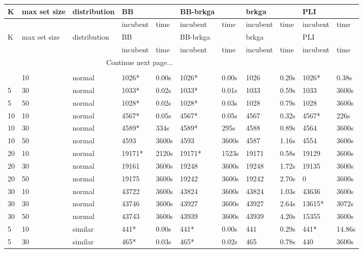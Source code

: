 \begin{scriptsize}
\setlength\LTleft{0pt}            %
\setlength\LTright{0pt}           %
\begin{longtable}{@{\extracolsep{\fill}}lllllllllll@{}}
\label{table:tests}\\
\hline
K & max set size & distribution & BB & & BB-brkga & & brkga & & PLI\\ 
\hline
& & & incubent & time & incubent & time & incubent & time & incubent & time\\ 
\hline
\endfirsthead
\hline
K & max set size & distribution & BB & & BB-brkga & & brkga & & PLI\\ 
\hline
& & & incubent & time & incubent & time & incubent & time & incubent & time\\ 
\hline
\endhead
\hline \multicolumn{5}{r}{{Continue next page...}} \\ 
\endfoot
\multicolumn{5}{r}{{}} \\ 
\endlastfoot
 5 & 10 & normal& 1026*& 0.00s& 1026*& 0.00s & 1026& 0.20s & 1026*& 0.38s \\
 5 & 30 & normal& 1033*& 0.02s& 1033*& 0.01s & 1033& 0.59s & 1033& 3600s\\
 5 & 50 & normal& 1028*& 0.02s& 1028*& 0.03s & 1028& 0.79s & 1028& 3600s\\
 10 & 10 & normal& 4567*& 0.05s& 4567*& 0.05s & 4567& 0.32s & 4567*& 226s \\
 10 & 30 & normal& 4589*& 334s & 4589*& 295s & 4588& 0.89s & 4564& 3600s\\
 10 & 50 & normal& 4593& 3600s& 4593& 3600s& 4587& 1.16s & 4554& 3600s\\
 20 & 10 & normal& 19171*& 2120s & 19171*& 1523s & 19171& 0.58s & 19129& 3600s\\
 20 & 30 & normal& 19161& 3600s& 19248& 3600s& 19248& 1.72s & 19135& 3600s\\
 20 & 50 & normal& 19175& 3600s& 19242& 3600s& 19242& 2.70s & 0& 3600s\\
 30 & 10 & normal& 43722& 3600s& 43824& 3600s& 43824& 1.03s & 43636& 3600s\\
 30 & 30 & normal& 43746& 3600s& 43927& 3600s& 43927& 2.64s & 13615*& 3072s \\
 30 & 50 & normal& 43743& 3600s& 43939& 3600s& 43939& 4.20s & 15355& 3600s\\
 5 & 10 & similar& 441*& 0.00s& 441*& 0.00s & 441& 0.29s & 441*& 14.86s \\
 5 & 30 & similar& 465*& 0.03s& 465*& 0.02s & 465& 0.78s & 440& 3600s\\

\end{longtable}
\end{scriptsize}
